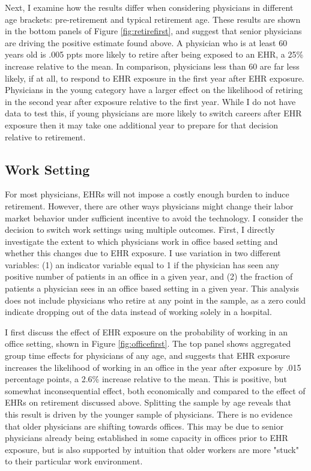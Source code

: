 \documentclass[11pt]{article}
\begin{document}
Next, I examine how the results differ when considering physicians in different age brackets: pre-retirement and typical retirement age. These results are shown in the bottom panels of Figure \ref{fig:retirefirst}, and suggest that senior physicians are driving the positive estimate found above. A physician who is at least 60 years old is .005 ppts more likely to retire after being exposed to an EHR, a 25\% increase relative to the mean. In comparison, physicians less than 60 are far less likely, if at all, to respond to EHR exposure in the first year after EHR exposure. Physicians in the young category have a larger effect on the likelihood of retiring in the second year after exposure relative to the first year. While I do not have data to test this, if young physicians are more likely to switch careers after EHR exposure then it may take one additional year to prepare for that decision relative to retirement.   



\subsection{Work Setting}

For most physicians, EHRs will not impose a costly enough burden to induce retirement. However, there are other ways physicians might change their labor market behavior under sufficient incentive to avoid the technology. I consider the decision to switch work settings using multiple outcomes. First, I directly investigate the extent to which physicians work in office based setting and whether this changes due to EHR exposure. I use variation in two different variables: (1) an indicator variable equal to 1 if the physician has seen any positive number of patients in an office in a given year, and (2) the fraction of patients a physician sees in an office based setting in a given year. This analysis does not include physicians who retire at any point in the sample, as a zero could indicate dropping out of the data instead of working solely in a hospital. 

I first discuss the effect of EHR exposure on the probability of working in an office setting, shown in Figure \ref{fig:officefirst}. The top panel shows aggregated group time effects for physicians of any age, and suggests that EHR exposure increases the likelihood of working in an office in the year after exposure by .015 percentage points, a 2.6\% increase relative to the mean. This is positive, but somewhat inconsequential effect, both economically and compared to the effect of EHRs on retirement discussed above. Splitting the sample by age reveals that this result is driven by the younger sample of physicians. There is no evidence that older physicians are shifting towards offices. This may be due to senior physicians already being established in some capacity in offices prior to EHR exposure, but is also supported by intuition that older workers are more "stuck" to their particular work environment. 
\end{document}

